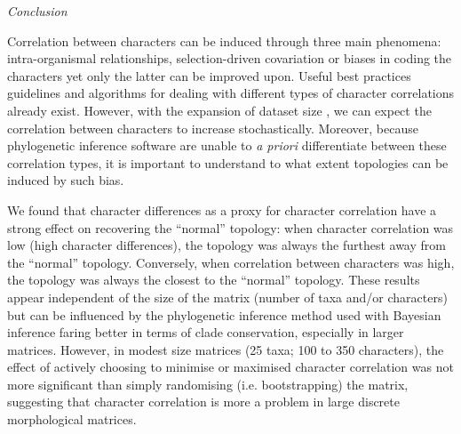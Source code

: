 \documentclass[12pt,letterpaper]{article}
\renewcommand{\subsection}[1]{%
\bigskip
\begin{center}
\begin{large}
\normalfont\itshape #1
\end{large}
\end{center}}
\begin{document}
\subsection{Conclusion}
Correlation between characters can be induced through three main phenomena: intra-organismal relationships, selection-driven covariation or biases in coding the characters yet only the latter can be improved upon.%
Useful best practices guidelines \citep[e.g.][]{Brazeau2011,simoes2017giant} and algorithms for dealing with different types of character correlations \citep[e.g. ][]{de2015parsimony,BrazeauNA} already exist.
However, with
the expansion of dataset size \citep[e.g.][> 1000 characters]{nithe2013,O'Leary08022013}, we can expect the correlation between characters to increase stochastically.
Moreover, because phylogenetic inference software are unable to \textit{a priori} differentiate between these correlation types, it is important to understand to what extent topologies can be induced %
 by such bias.

We found that character differences as a proxy for character correlation have a strong effect on recovering the ``normal'' topology: when character correlation was low (high character differences), the topology was always the furthest away from the ``normal'' topology.
Conversely, when correlation between characters was high, the topology was always the closest %
 to the ``normal'' topology.
These results appear independent of the size of the matrix (number of taxa and/or characters) but can be influenced by the phylogenetic inference method used with Bayesian inference faring better in terms of clade conservation, especially in larger matrices.
However, in modest size matrices (25 taxa; 100 to 350 characters), the effect of actively choosing to minimise or maximised character correlation was not more significant than simply randomising (i.e. bootstrapping) the matrix, suggesting that character correlation is more a problem in large discrete morphological matrices.
\end{document}
